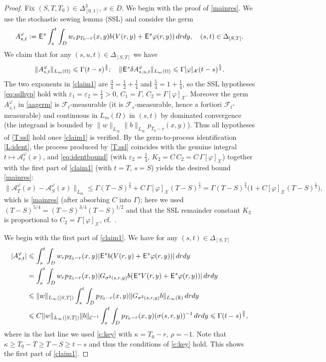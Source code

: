 \documentclass[12pt]{article}
\theoremstyle{definition}
\DeclareMathOperator{\1}{\mathbbm{1}}%
\def\E{\hskip.15ex\mathsf{E}\hskip.10ex}
\def\phi{\varphi}
\renewcommand{\ge}{\geqslant}
\renewcommand{\le}{\leqslant}
\newcommand{\A}{\mathcal{A}}
\newcommand{\C}{\mathcal{C}}
\newcommand{\F}{\mathcal{F}}
\newcommand{\R}{\mathbb{R}}
\newcommand{\X}{\mathcal{X}}
\begin{document}
\begin{proof}
	Fix $(S,T,T_0)\in\Delta_{[0,1]}^3$, $x\in D$. 
We begin with the proof of \eqref{mainres}. 
We use the stochastic sewing lemma (SSL) \cite[Theorem~2.1]{LeSSL} and consider the germ 
\begin{equation}\label{aagerm}
A_{s,t}^\phi:=\E^s\int_s^t \int_D w_r p_{T_0-r}(x,y) b( V(r,y)+\E^s
\phi(r,y))\,dr dy,\quad (s,t)\in\Delta_{[S,T]}.
\end{equation}
We claim that for any $(s,u,t)\in\Delta_{[S,T]}$ we have 
\begin{equation}\label{claim1}
\|A_{s,t}^\phi\|_{L_m(\Omega)}\le \Gamma (t-s)^{\frac34};\quad
\|\E^s\delta A^\phi_{s,u,t}\|_{L_m(\Omega)}\le  \Gamma [\phi]_{\X}(t-s)^{\frac54}.
\end{equation}
The two exponents in \eqref{claim1} are $\tfrac34=\tfrac12+\tfrac14$ and
$\tfrac54=1+\tfrac14$, so the SSL hypotheses \eqref{eq:sslhyp} hold with
$\varepsilon_1=\varepsilon_2=\tfrac14>0$, $C_1=\Gamma$, $C_2=\Gamma[\phi]_{\X}$.
Moreover the germ $A^\phi_{s,t}$ in \eqref{aagerm} is $\F_t$-measurable (it is
$\F_s$-measurable, hence a fortiori $\F_t$-measurable) and continuous in $L_m(\Omega)$
in $(s,t)$ by dominated convergence (the integrand is bounded by
$\|w\|_{L_\infty}\|b\|_{L_\infty}p_{T_0-r}(x,y)$). Thus all hypotheses of \cref{T:ssl}
hold once \eqref{claim1} is verified. By the germ-to-process identification
\cref{L:ident}, the process produced by \cref{T:ssl} coincides with the genuine
integral $t\mapsto\A^\phi_t(x)$, and \eqref{eq:identbound} (with $\varepsilon_2=\tfrac14$,
$K_2=C\,C_2=C\,\Gamma[\phi]_{\X}$) together with the first part of \eqref{claim1}
(with $t=T$, $s=S$) yields the desired bound \eqref{mainres}:
\[
\|\A^\phi_T(x)-\A^\phi_S(x)\|_{L_m}\le\Gamma(T-S)^{\frac34}+C\,\Gamma[\phi]_{\X}(T-S)^{\frac54}
= \Gamma(T-S)^{\frac34}\bigl(1+C[\phi]_{\X}(T-S)^{\frac12}\bigr),
\]
which is \eqref{mainres} (after absorbing $C$ into $\Gamma$); here we used
$(T-S)^{5/4}=(T-S)^{3/4}(T-S)^{1/2}$ and that the SSL remainder constant $K_2$ is
proportional to $C_2=\Gamma[\phi]_{\X}$, cf.\ \cite[Theorem~2.1]{LeSSL}.

We begin with the first part of \eqref{claim1}. We have for any $(s,t)\in\Delta_{[S,T]}$
\begin{align*}
|A_{s,t}^\phi|&\le \int_s^t \int_D w_r  p_{T_0-r}(x,y) |\E^s b( V(r,y)+\E^s \phi(r,y))|\,dr dy\\
&= \int_s^t \int_D w_r p_{T_0-r}(x,y) |G_{\sigma^2(s,r,y)} b(\E^s V(r,y)+\E^s\phi(r,y))|\,dr dy\\
&\le \|w\|_{L_\infty([S,T])} \int_s^t \int_D    p_{T_0-r}(x,y) \|G_{\sigma^2(s,r,y)} b\|_{L_\infty(\R)}\,dr dy\\
&\le C\|w\|_{L_\infty([S,T])}  \|b\|_{\C^{-1}}\int_s^t \int_D p_{T_0-r}(x,y) (\sigma(s,r,y))^{-1}\,dr dy\le \Gamma (t-s)^{\frac34}, 
\end{align*}
 where in the last line we used \cref{c:key} with $ \kappa=T_0-r$, $\rho=-1$. Note that $\kappa\ge  T_0-T\ge T-S\ge t-s$ and thus the conditions of \cref{c:key} hold. This shows the first part of  \eqref{claim1}. 
 

\end{proof}
\end{document}
